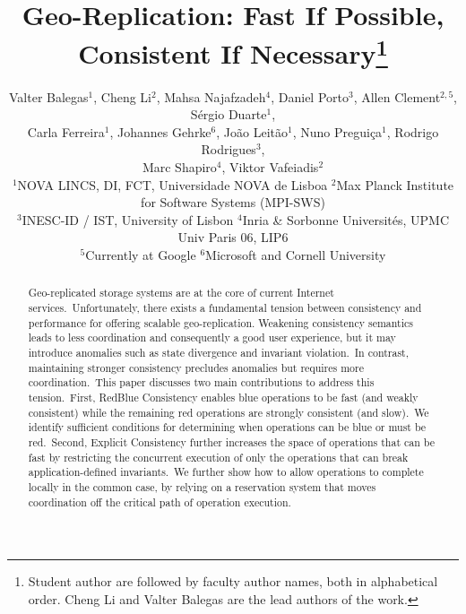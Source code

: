 \documentclass[11pt,dvipdfm]{article}
\begin{document}
\title{Geo-Replication: Fast If Possible, Consistent If Necessary\thanks{Student author are followed by faculty author names, both in alphabetical order. Cheng Li and Valter Balegas are the lead authors of the work.}}

\author{Valter Balegas$^1$, Cheng Li$^2$, Mahsa Najafzadeh$^4$, Daniel Porto$^{3}$,
Allen Clement$^{2,5}$, Sérgio Duarte$^1$, \\
Carla Ferreira$^1$, Johannes Gehrke$^6$, Jo\~{a}o Leit\~{a}o$^1$, Nuno Preguiça$^1$, Rodrigo Rodrigues$^3$, \\
Marc Shapiro$^4$, Viktor Vafeiadis$^2$\\
\small $^1$NOVA LINCS, DI, FCT, Universidade NOVA de Lisboa
$^2$Max Planck Institute for Software Systems (MPI-SWS)\\
\small $^3$INESC-ID / IST, University of Lisbon
$^4$Inria \& Sorbonne Universités, UPMC Univ Paris 06, LIP6\\
\small $^5$Currently at Google
$^6$Microsoft and Cornell University}

\graphicspath{{chengli/}}

\maketitle

\begin{abstract}
Geo-replicated storage systems are at the core of current Internet services.\ Unfortunately,
there exists a fundamental tension between consistency and performance for offering scalable
geo-replication. Weakening consistency semantics leads to less coordination and consequently
a good user experience, but it may introduce anomalies such as state divergence and invariant violation.\ In
contrast, maintaining stronger consistency precludes anomalies but requires more coordination.\ This
paper discusses two main contributions to address this tension.\ First, RedBlue Consistency
enables blue operations to be fast (and weakly consistent) while the remaining red operations
are strongly consistent (and slow).\ We identify sufficient conditions for determining when
operations can be blue or must be red.\ Second, Explicit Consistency further increases the space
of operations that can be fast by restricting the concurrent execution of only the operations
that can break application-defined invariants.\ We further show how to allow operations to complete
locally in the common case, by relying on a reservation system that moves coordination off the
critical path of operation execution.
\end{abstract}
\end{document}
